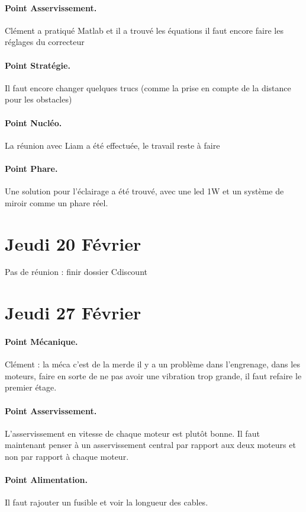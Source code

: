 \documentclass[a4paper,10pt]{report}
\begin{document}
\begin{spacing}{1.5}
\paragraph{Point Asservissement.} Clément a pratiqué Matlab et il a trouvé les
équations il faut encore faire les réglages du correcteur

\paragraph{Point Stratégie.} Il faut encore changer quelques trucs (comme la
prise en compte de la distance pour les obstacles)

\paragraph{Point Nucléo.} La réunion avec Liam a été effectuée, le travail reste
à faire

\paragraph{Point Phare.} Une solution pour l'éclairage a été trouvé, avec une
led 1W et un système de miroir comme un phare réel.

\newpage
\section*{Jeudi 20 Février}
Pas de réunion : finir dossier Cdiscount

\newpage
\section*{Jeudi 27 Février}
\paragraph{Point Mécanique.} Clément : \og la méca c'est de la merde\fg{} il y a
un problème dans l'engrenage, dans les moteurs, faire en sorte de ne pas avoir
une vibration trop grande, il faut refaire le premier étage.
\paragraph{Point Asservissement.}  L'asservissement en vitesse de chaque moteur
est plutôt bonne. Il faut maintenant penser à un asservissement central par
rapport aux deux moteurs et non par rapport à chaque moteur.
\paragraph{Point Alimentation.} Il faut rajouter un fusible et voir la longueur
des cables.

\end{spacing}
\end{document}

